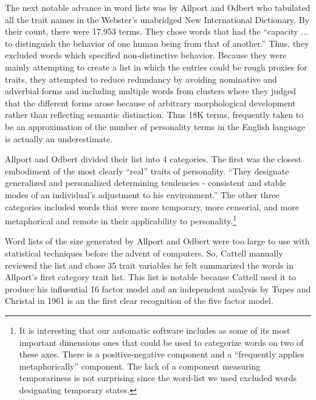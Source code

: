 \documentclass[eric_thesis.tex]{subfiles}
\begin{document}
The next notable advance in word lists was by Allport and Odbert  who tabulated 
all the trait names in the
Webster's unabridged New International Dictionary. By their count, there were
17,953 terms. They chose words that had the ``capacity ... to distinguish 
the behavior of one human being from that of another.'' Thus, they excluded
words which specified non-distinctive behavior. Because they were
mainly attempting to create a list in which the entries could be rough proxies
for traits, they attempted to reduce redundancy by avoiding nominative and
adverbial forms and including multiple words from clusters where they judged 
that the different forms arose because of arbitrary morphological development 
rather than reflecting semantic distinction. Thus 18K terms, frequently taken to 
be an approximation
of the number of personality terms in the English language is actually an
underestimate.

Allport and Odbert divided their list into 4 categories. The first was the
closest embodiment of the most clearly ``real'' traits of personality. ``They
designate generalized and personalized determining tendencies - consistent and
stable modes of an individual's adjustment to his environment.'' The other three
categories included words that were more temporary, more censorial, and more
metaphorical and remote in their applicability to personality.\footnote{ 
It is interesting that our automatic software includes as some of its most 
important dimensions ones that could be used to categorize words on two of these
axes.
There is a positive-negative component and a ``frequently applies metaphorically''
component. The lack of a component measuring temporariness is not surprising
since the word-list we used excluded words designating temporary states.}

Word lists of the size generated by Allport and Odbert were too large to use 
with statistical techniques before the advent of computers. So, Cattell  manually reviewed the list and chose 35 trait variables he felt
summarized the words in Allport's first category trait list. This list is
notable because Cattell used it to produce his influential 16 factor model
and an independent analysis by Tupes and Christal in 1961  is an the first clear recognition of the five factor 
model.
\end{document}
